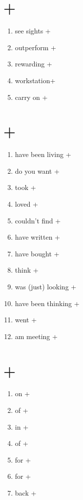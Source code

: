 \documentclass[a4paper, fontsize=10bp]{article} %
\begin{document}

\section{+}

\begin{enumerate}
    \item see sights +
    \item outperform + 
    \item rewarding +
    \item workstation+ 
    \item carry on +
\end{enumerate}

\section{+}

\begin{enumerate}
    \item have been living +
    \item do you want + 
    \item took +
    \item loved +
    \item couldn't find +
    \item have written +
    \item have bought +
    \item think +
    \item was (just) looking +
    \item have been thinking +
    \item went + 
    \item am meeting +
\end{enumerate}

\section{+}

\begin{enumerate}
    \item on +
    \item of +
    \item in +
    \item of +
    \item for +
    \item for +
    \item back +
\end{enumerate}
\end{document}
